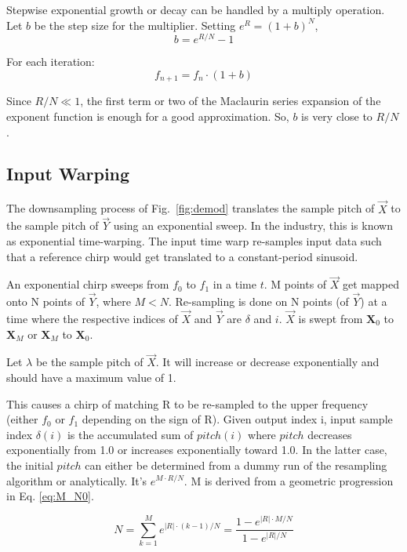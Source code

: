 Stepwise exponential growth or decay can be handled by a multiply operation.
Let $b$ be the step size for the multiplier.
Setting $e^R = (1 + b)^N$,
\begin{equation}
b = e^{R/N} - 1
\end{equation}

For each iteration:
\begin{equation}
f_{n+1} = f_n \cdot (1 + b)
\end{equation}

Since $R/N \ll 1$, the first term or two of the Maclaurin series expansion of the
exponent function is enough for a good approximation.
So, $b$ is very close to $R/N$.

\subsection{Input Warping}

The downsampling process of Fig.~\ref{fig:demod} translates the sample pitch of
$\vec{X}$ to the sample pitch of $\vec{Y}$ using an exponential sweep.
In the industry, this is known as exponential time-warping.
The input time warp re-samples input data such that a reference chirp would get
translated to a constant-period sinusoid.

An exponential chirp sweeps from $f_0$ to $f_1$ in a time $t$.
M points of $\vec{X}$ get mapped onto N points of $\vec{Y}$, where $M < N$.
Re-sampling is done on N points (of $\vec{Y}$) at a time where the respective indices of
$\vec{X}$ and $\vec{Y}$ are $\delta$ and $i$.
$\vec{X}$ is swept from $\mathbf{X}_0$ to $\mathbf{X}_M$
or $\mathbf{X}_M$ to $\mathbf{X}_0$.

Let $\lambda$ be the sample pitch of $\vec{X}$.
It will increase or decrease exponentially and should have a maximum value of 1.

This causes a chirp of matching R to be re-sampled to the upper frequency
(either $f_0$ or $f_1$ depending on the sign of R).
Given output index i, input sample index $\delta(i)$ is the accumulated sum of
$pitch(i)$ where $pitch$ decreases exponentially from 1.0
or increases exponentially toward 1.0.
In the latter case, the initial $pitch$ can either be determined from a dummy
run of the resampling algorithm or analytically.
It's $e^{M \cdot R/N}$. 
M is derived from a geometric progression in Eq. \ref{eq:M_N0}.

\begin{equation}  \label{eq:M_N0}
N = \sum_{k=1}^{M} e^{|R| \cdot (k-1)/N} = \frac{1 - e^{|R| \cdot M/N}}{1 - e^{|R|/N}}
\end{equation}

